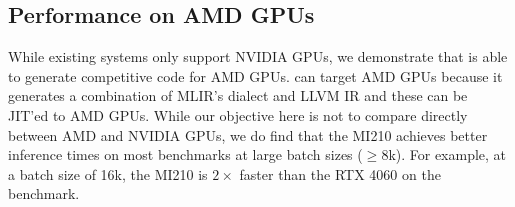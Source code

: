 


\subsection{Performance on AMD GPUs}
While existing systems only support NVIDIA GPUs, we demonstrate that \Treebeard{} 
is able to generate competitive code for AMD GPUs. \Treebeard{} can target AMD GPUs 
because it generates a combination of MLIR's  dialect and LLVM IR 
and these can be JIT'ed to AMD GPUs. While our objective here is not to compare directly 
between AMD and NVIDIA GPUs, we do find that the MI210 achieves better inference times 
on most benchmarks at large batch sizes ($\geq8$k). For example, at a batch size of 16k,
the MI210 is $2\times$ faster than the RTX 4060 on the  benchmark. 

